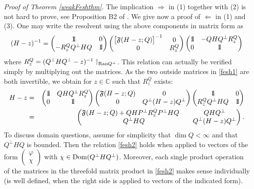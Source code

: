 \documentclass[letterpaper,onecolumn,11pt,accepted=2021-12-09]{quantumarticle}
\numberwithin{equation}{section}
\newcommand{\bbbone}{\mathchoice {\rm 1\mskip-4mu l} {\rm 1\mskip-4mu l}
	{\rm 1\mskip-4.5mu l} {\rm 1\mskip-5mu l}}
\begin{document}
{\em Proof of Theorem \ref{weakFeshthm}.} The implication $\Rightarrow$ in (1) together with (2) is not hard to prove, see Proposition B2 of \cite{KM1}. We give now a proof of $\Leftarrow$ in (1) and (3). One may write the resolvent using the above components in matrix form as
\begin{equation}
(H-z)^{-1} = 
\begin{pmatrix}
\bbbone & 0\\
-R^Q_zQ^\perp HQ & \bbbone
\end{pmatrix}
\begin{pmatrix}
\big[{\mathfrak F}(H-z;Q)\big]^{-1} & 0\\
0 & R_z^Q
\end{pmatrix}
\begin{pmatrix}
\bbbone & -QH Q^\perp R_z^Q \\
0 & \bbbone
\end{pmatrix}
\label{fesh1}
\end{equation}
where $R_z^Q=(Q^\perp HQ^\perp-z)^{-1}\upharpoonright_{{\rm Ran}Q^\perp}$. This relation can actually be verified simply by multiplying out the matrices. As the two outside matrices in \eqref{fesh1} are both invertible, we obtain for $z\in\mathbb C$ such that $R_z^Q$ exists:
\begin{eqnarray}
H-z &=& 
\begin{pmatrix}
\bbbone & QH Q^\perp R_z^Q\\
0 & \bbbone
\end{pmatrix}
\begin{pmatrix}
{\mathfrak F}(H-z;Q) & 0\\
0 & Q^\perp (H-z) Q^\perp
\end{pmatrix}
\begin{pmatrix}
\bbbone & 0 \\
R^Q_zQ^\perp HQ & \bbbone
\end{pmatrix}\nonumber\\
&=& 
\begin{pmatrix}
{\mathfrak F}(H-z;Q)  +QHP^\perp R^Q_z P^\perp HQ \quad &  QH Q^\perp \\	
Q^\perp HQ & Q^\perp (H-z) Q^\perp
\end{pmatrix}. 
\label{fesh2}
\end{eqnarray}
To discuss domain questions, assume for simplicity that $\dim Q<\infty$ and that  $Q^\perp HQ$ is bounded. Then the relation \eqref{fesh2} holds when applied to vectors of the form $\begin{pmatrix} \varphi \\ \chi\end{pmatrix}$ with $\chi\in{\rm Dom}(Q^\perp H Q^\perp)$. Moreover, each single product operation of the matrices in the threefold matrix product in \eqref{fesh2} makes sense individually (is well defined, when the right side is applied to vectors of the indicated form). 
\end{document}

